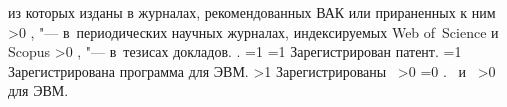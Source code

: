 {\begin{refsection}
         из которых изданы в журналах, рекомендованных ВАК или прираненных к ним\sloppy%
        \ifnum \value{citeauthorscopuswos}>0%
            ,  "--- в~периодических научных журналах, индексируемых Web of~Science и Scopus\sloppy%
        \fi%
        \ifnum \value{citeauthorconf}>0%
            ,  "--- в~тезисах докладов.
        \else%
            .
        \fi%
        \ifnum \value{citeregistered}=1%
            \ifnum \value{citeauthorpatent}=1%
                Зарегистрирован  патент.
            \fi%
            \ifnum \value{citeauthorprogram}=1%
                Зарегистрирована  программа для ЭВМ.
            \fi%
        \fi%
        \ifnum \value{citeregistered}>1%
            Зарегистрированы\ %
            \ifnum \value{citeauthorpatent}>0%
            \sloppy%
            \ifnum \value{citeauthorprogram}=0 . \else \ и~\fi%
            \fi%
            \ifnum \value{citeauthorprogram}>0%
             для ЭВМ.
            \fi%
        \fi%
    \end{refsection}%
    \begin{refsection}
        \nocite{tyu:daor}%
        \nocite{tyu:jphys}%
        \nocite{tyu:motor}%
        \nocite{tyu:msim22}%
        \nocite{tyu:opta}%
        \nocite{tyu:reis}%
        \nocite{tyu22:ring}%
        \nocite{tyu:fmh}%
    \end{refsection}%
}
